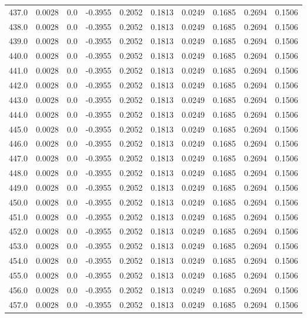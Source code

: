 \begin{longtable}{lrrrrrrrrr}
437.0 & 0.0028 & 0.0 & -0.3955 & 0.2052 & 0.1813 & 0.0249 & 0.1685 & 0.2694 & 0.1506 \\
438.0 & 0.0028 & 0.0 & -0.3955 & 0.2052 & 0.1813 & 0.0249 & 0.1685 & 0.2694 & 0.1506 \\
439.0 & 0.0028 & 0.0 & -0.3955 & 0.2052 & 0.1813 & 0.0249 & 0.1685 & 0.2694 & 0.1506 \\
440.0 & 0.0028 & 0.0 & -0.3955 & 0.2052 & 0.1813 & 0.0249 & 0.1685 & 0.2694 & 0.1506 \\
441.0 & 0.0028 & 0.0 & -0.3955 & 0.2052 & 0.1813 & 0.0249 & 0.1685 & 0.2694 & 0.1506 \\
442.0 & 0.0028 & 0.0 & -0.3955 & 0.2052 & 0.1813 & 0.0249 & 0.1685 & 0.2694 & 0.1506 \\
443.0 & 0.0028 & 0.0 & -0.3955 & 0.2052 & 0.1813 & 0.0249 & 0.1685 & 0.2694 & 0.1506 \\
444.0 & 0.0028 & 0.0 & -0.3955 & 0.2052 & 0.1813 & 0.0249 & 0.1685 & 0.2694 & 0.1506 \\
445.0 & 0.0028 & 0.0 & -0.3955 & 0.2052 & 0.1813 & 0.0249 & 0.1685 & 0.2694 & 0.1506 \\
446.0 & 0.0028 & 0.0 & -0.3955 & 0.2052 & 0.1813 & 0.0249 & 0.1685 & 0.2694 & 0.1506 \\
447.0 & 0.0028 & 0.0 & -0.3955 & 0.2052 & 0.1813 & 0.0249 & 0.1685 & 0.2694 & 0.1506 \\
448.0 & 0.0028 & 0.0 & -0.3955 & 0.2052 & 0.1813 & 0.0249 & 0.1685 & 0.2694 & 0.1506 \\
449.0 & 0.0028 & 0.0 & -0.3955 & 0.2052 & 0.1813 & 0.0249 & 0.1685 & 0.2694 & 0.1506 \\
450.0 & 0.0028 & 0.0 & -0.3955 & 0.2052 & 0.1813 & 0.0249 & 0.1685 & 0.2694 & 0.1506 \\
451.0 & 0.0028 & 0.0 & -0.3955 & 0.2052 & 0.1813 & 0.0249 & 0.1685 & 0.2694 & 0.1506 \\
452.0 & 0.0028 & 0.0 & -0.3955 & 0.2052 & 0.1813 & 0.0249 & 0.1685 & 0.2694 & 0.1506 \\
453.0 & 0.0028 & 0.0 & -0.3955 & 0.2052 & 0.1813 & 0.0249 & 0.1685 & 0.2694 & 0.1506 \\
454.0 & 0.0028 & 0.0 & -0.3955 & 0.2052 & 0.1813 & 0.0249 & 0.1685 & 0.2694 & 0.1506 \\
455.0 & 0.0028 & 0.0 & -0.3955 & 0.2052 & 0.1813 & 0.0249 & 0.1685 & 0.2694 & 0.1506 \\
456.0 & 0.0028 & 0.0 & -0.3955 & 0.2052 & 0.1813 & 0.0249 & 0.1685 & 0.2694 & 0.1506 \\
457.0 & 0.0028 & 0.0 & -0.3955 & 0.2052 & 0.1813 & 0.0249 & 0.1685 & 0.2694 & 0.1506 \\

\end{longtable}
